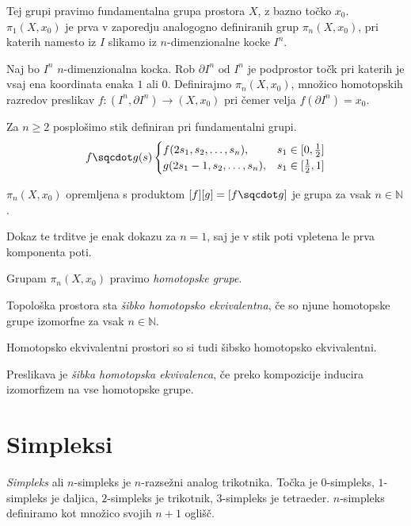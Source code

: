 Tej grupi pravimo fundamentalna grupa prostora $X$, z bazno točko $x_0$. $\pi_1(X,x_0)$ je prva v zaporedju analogogno definiranih grup $\pi_n(X,x_0)$, pri katerih namesto iz $I$ slikamo iz $n$-dimenzionalne kocke $I^n$.


Naj bo $I^n$ $n$-dimenzionalna kocka. Rob $\partial I^n \text{ od } I^n$ je podprostor točk pri katerih je vsaj ena koordinata enaka $1$ ali $0$. Definirajmo $\pi_n(X,x_0)$, množico homotopskih razredov preslikav $f:(I^n,\partial I^n) \rightarrow (X,x_0)$ pri čemer velja $f(\partial I^n) = x_0$.


Za $n\ge 2$ posplošimo stik definiran pri fundamentalni grupi.
$$ f\sqcdot g(s) \begin{cases}
    f(2s_1,s_2,\ldots,s_n), & s_1\in [0,\frac{1}{2}] \\
    g(2s_1-1,s_2,\ldots,s_n), & s_1 \in [\frac{1}{2},1]
\end{cases}
$$

\begin{izrek}
    $\pi_n(X,x_0)$ opremljena s produktom $[f][g] = [f\sqcdot g]$ je grupa za vsak $n \in \mathds{N}$.
\end{izrek}

Dokaz te trditve je enak dokazu za $n=1$, saj je v stik poti vpletena le prva komponenta poti.

Grupam $\pi_n(X,x_0)$ pravimo \textit{homotopske grupe}.

\begin{definicija}
    Topološka prostora sta \textit{šibko homotopsko ekvivalentna}, če so njune homotopske grupe izomorfne za vsak $n \in \mathds{N}$.
\end{definicija}

Homotopsko ekvivalentni prostori so si tudi šibsko homotopsko ekvivalentni.

\begin{definicija}
    Preslikava je \textit{šibka homotopska ekvivalenca}, če preko kompozicije inducira izomorfizem na vse homotopske grupe.
\end{definicija}


\section{Simpleksi}

\textit{Simpleks} ali $n$-simpleks je $n$-razsežni analog trikotnika. Točka je $0$-simpleks, $1$-simpleks je daljica, $2$-simpleks je trikotnik,
$3$-simpleks je tetraeder. $n$-simpleks definiramo kot množico svojih $n+1$ oglišč.

